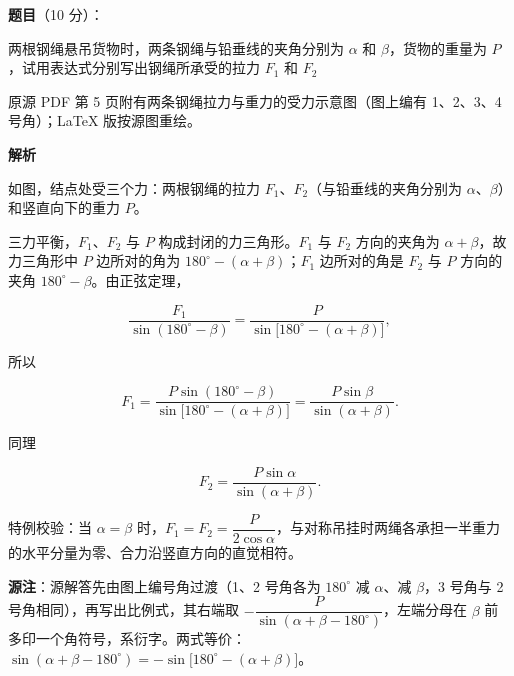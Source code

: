 \begin{answer}

\textbf{题目}（10 分）：

两根钢绳悬吊货物时，两条钢绳与铅垂线的夹角分别为 $\alpha$ 和 $\beta$，货物的重量为 $P$，试用表达式分别写出钢绳所承受的拉力 $F_1$ 和 $F_2$

\begin{gktip}
原源 PDF 第 5 页附有两条钢绳拉力与重力的受力示意图（图上编有 1、2、3、4 号角）；LaTeX 版按源图重绘。
\end{gktip}
\nopagebreak[4]
\begin{center}\end{center}
\nopagebreak[4]
\textbf{解析}

如图，结点处受三个力：两根钢绳的拉力 $F_1$、$F_2$（与铅垂线的夹角分别为 $\alpha$、$\beta$）和竖直向下的重力 $P$。
\nopagebreak[4]
\begin{center}\end{center}
\nopagebreak[4]
三力平衡，$F_1$、$F_2$ 与 $P$ 构成封闭的力三角形。$F_1$ 与 $F_2$ 方向的夹角为 $\alpha+\beta$，故力三角形中 $P$ 边所对的角为 $180^\circ-(\alpha+\beta)$；$F_1$ 边所对的角是 $F_2$ 与 $P$ 方向的夹角 $180^\circ-\beta$。由正弦定理，

\nopagebreak[4]
\[
\frac{F_1}{\sin(180^\circ-\beta)}
=\frac{P}{\sin\bigl[180^\circ-(\alpha+\beta)\bigr]},
\]

所以

\nopagebreak[4]
\[
F_1=\frac{P\sin(180^\circ-\beta)}{\sin\bigl[180^\circ-(\alpha+\beta)\bigr]}
=\frac{P\sin\beta}{\sin(\alpha+\beta)}.
\]

同理

\nopagebreak[4]
\[
F_2=\frac{P\sin\alpha}{\sin(\alpha+\beta)}.
\]

特例校验：当 $\alpha=\beta$ 时，$F_1=F_2=\dfrac{P}{2\cos\alpha}$，与对称吊挂时两绳各承担一半重力的水平分量为零、合力沿竖直方向的直觉相符。

\begin{gktip}
\textbf{源注}：源解答先由图上编号角过渡（1、2 号角各为 $180^\circ$ 减 $\alpha$、减 $\beta$，3 号角与 2 号角相同），再写出比例式，其右端取 $-\dfrac{P}{\sin(\alpha+\beta-180^\circ)}$，左端分母在 $\beta$ 前多印一个角符号，系衍字。两式等价：$\sin(\alpha+\beta-180^\circ)=-\sin\bigl[180^\circ-(\alpha+\beta)\bigr]$。
\end{gktip}


\end{answer}